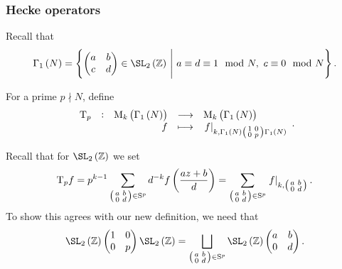 \subsubsection{Hecke operators}

Recall that
$$ \Gamma_1\br{N} = \cbr{\twobytwo{a}{b}{c}{d} \in \SL_2\br{\ZZ} \st a \equiv d \equiv 1 \mod N, \ c \equiv 0 \mod N}. $$

\begin{definition}
For a prime $ p \nmid N $, define
$$ \function[\T_p]{\M_k\br{\Gamma_1\br{N}}}{\M_k\br{\Gamma_1\br{N}}}{f}{\eval{f}_{k, \Gamma_1\br{N}\twobytwosmall{1}{0}{0}{p}\Gamma_1\br{N}}}. $$
\end{definition}

Recall that for $ \SL_2\br{\ZZ} $ we set
$$ \T_pf = p^{k - 1}\sum_{\twobytwosmall{a}{b}{0}{d} \in \S^p} d^{-k}f\br{\dfrac{az + b}{d}} = \sum_{\twobytwosmall{a}{b}{0}{d} \in \S^p} \eval{f}_{k, \twobytwosmall{a}{b}{0}{d}}. $$
To show this agrees with our new definition, we need that
$$ \SL_2\br{\ZZ}\twobytwo{1}{0}{0}{p}\SL_2\br{\ZZ} = \bigsqcup_{\twobytwosmall{a}{b}{0}{d} \in \S^p} \SL_2\br{\ZZ}\twobytwo{a}{b}{0}{d}. $$

